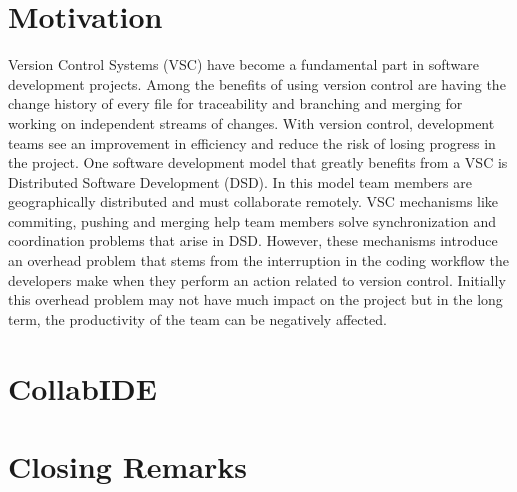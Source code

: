 \documentclass[10pt, conference, draft]{IEEEtran}
\begin{document}
\IEEEpeerreviewmaketitle


\section{Motivation}
\label{sec:motivation}

Version Control Systems (VSC) have become a fundamental part in software development projects. Among the benefits of using version control are having the change history of every file for traceability and branching and merging for working on independent streams of changes. With version control, development teams see an improvement in efficiency and reduce the risk of losing progress in the project. One software development model that greatly benefits from a VSC is Distributed Software Development (DSD). In this model team members are geographically distributed and must collaborate remotely. VSC mechanisms like commiting, pushing and merging help team members solve synchronization and coordination problems that arise in DSD. However, these mechanisms introduce an overhead problem that stems from the interruption in the coding workflow the developers make when they perform an action related to version control. Initially this overhead problem may not have much impact on the project but in the long term, the productivity of the team can be negatively affected. 

\section{CollabIDE}
\label{sec:collab-ide}


\section{Closing Remarks}
\label{sec:conclusion}





%


  
\end{document}
